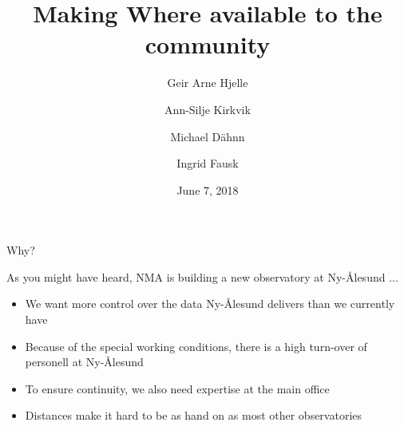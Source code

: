 \documentclass[ignorenonframetext,12pt,t]{beamer}
\title{Making Where available to the community}
\author{Geir Arne Hjelle \and Ann-Silje Kirkvik \and Michael Dähnn \and Ingrid Fausk}
\date{June 7, 2018}
\begin{document}
\frame{\titlepage}


\begin{frame}{Why?}
  \begin{centering}
    As you might have heard, NMA is building a new observatory at Ny-Ålesund ...
  \end{centering}
  \pause

  \begin{itemize}
  \item<2-> We want more control over the data Ny-Ålesund delivers than we currently have
  \end{itemize}
  
  \begin{itemize}
  \item<3-> Because of the special working conditions, there is a high turn-over of personell at Ny-Ålesund
  \item<4-> To ensure continuity, we also need expertise at the main office
  \item<5-> Distances make it hard to be as hand on as most other observatories
  \end{itemize}
\end{frame}
\end{document}
